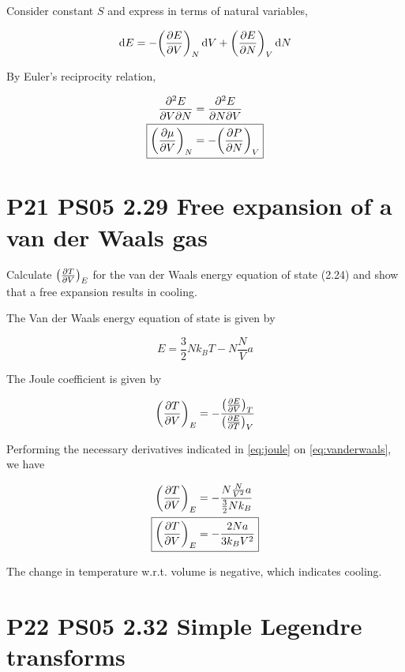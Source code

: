\documentclass[9pt,a4paper,twocolumn]{article}
\begin{document}
Consider constant $S$ and express in terms of natural variables,

\begin{equation}
	\dd{E} = -\qty(\pdv{E}{V})_N \dd{V} + \qty(\pdv{E}{N})_V \dd{N}
\end{equation}

By Euler's reciprocity relation,

\begin{align}
	\pdv{E}{V}{N} &= \pdv{E}{N}{V} \\
	\Aboxed{
		\qty(\pdv{\mu}{V})_N &= -\qty(\pdv{P}{N})_V
	} \label{eq:proof-muvn}
\end{align}

\section{P21 PS05 2.29 Free expansion of a van der Waals gas}

Calculate $\qty(\pdv{T}{V})_E$ for the van der Waals energy equation of state (2.24) and show that a free expansion results in cooling.

The Van der Waals energy equation of state is given by

\begin{equation}\label{eq:vanderwaals}
	E = \frac{3}{2} Nk_B T - N \frac{N}{V}a
\end{equation}

The Joule coefficient is given by

\begin{equation}\label{eq:joule}
	\qty(\pdv{T}{V})_E = -\frac{\qty(\pdv{E}{V})_T}{\qty(\pdv{E}{T})_V}
\end{equation}

Performing the necessary derivatives indicated in \eqref{eq:joule} on \eqref{eq:vanderwaals}, we have

\begin{align}
	\qty(\pdv{T}{V})_E &= -\frac{N\frac{N}{V^2}a}{\frac{3}{2}Nk_B} \nonumber \\
	\Aboxed{	
		\qty(\pdv{T}{V})_E &= -\frac{2Na}{3k_B V^2} \label{eq:answer}
	}
\end{align}

The change in temperature w.r.t. volume is negative, which indicates cooling.

\section{P22 PS05 2.32 Simple Legendre transforms}
\end{document}
